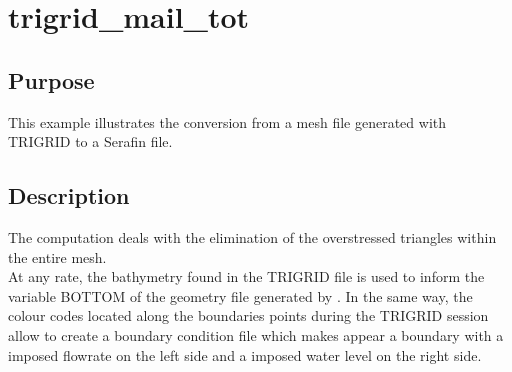 \chapter{trigrid\_mail\_tot}
%
%
\section{Purpose}
This example illustrates the conversion from a mesh file generated with
TRIGRID to a Serafin file.
%
\section{Description}
The computation deals with the elimination of the overstressed triangles within
the entire mesh.\\
At any rate, the bathymetry found in the TRIGRID file is used to inform the
variable BOTTOM of the geometry file generated by \stbtel. In the same way, the
colour codes located along the boundaries points during the TRIGRID session
allow \stbtel to create a boundary condition file which makes appear a boundary
with a imposed flowrate on the left side and a imposed water level on the right
side.

